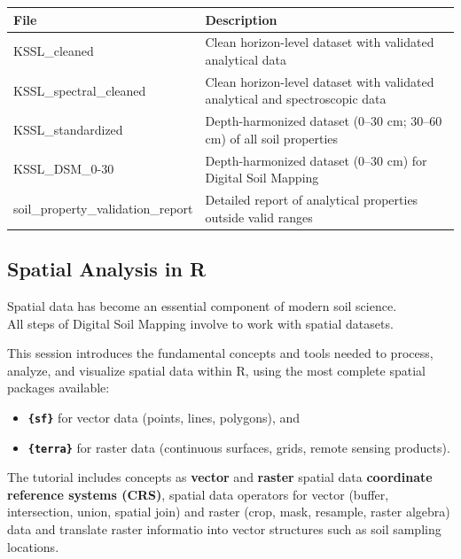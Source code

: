 \documentclass[
  10pt,
  b5paper,
  oneside]{book}
\providecommand{\tightlist}{%
  \setlength{\itemsep}{0pt}\setlength{\parskip}{0pt}}
\begin{document}
\begin{longtable}[]{@{}
  >{\raggedright\arraybackslash}p{}
  >{\raggedright\arraybackslash}p{}@{}}
\toprule\noalign{}
\begin{minipage}[b]{\linewidth}\raggedright
File
\end{minipage} & \begin{minipage}[b]{\linewidth}\raggedright
Description
\end{minipage} \\
\midrule\noalign{}
\endhead
\bottomrule\noalign{}
\endlastfoot
KSSL\_cleaned & Clean horizon-level dataset with validated analytical data \\
KSSL\_spectral\_cleaned & Clean horizon-level dataset with validated analytical and spectroscopic data \\
KSSL\_standardized & Depth-harmonized dataset (0--30 cm; 30--60 cm) of all soil properties \\
KSSL\_DSM\_0-30 & Depth-harmonized dataset (0--30 cm) for Digital Soil Mapping \\
soil\_property\_validation\_report & Detailed report of analytical properties outside valid ranges \\
\end{longtable}

\subsection{Spatial Analysis in R}\label{spatial-analysis-in-r}

Spatial data has become an essential component of modern soil science.\\
All steps of Digital Soil Mapping involve to work with spatial datasets.

This session introduces the fundamental concepts and tools needed to process, analyze, and visualize spatial data within R, using the most complete spatial packages available:

\begin{itemize}
\tightlist
\item
  \textbf{\texttt{\{sf\}}} for vector data (points, lines, polygons), and\\
\item
  \textbf{\texttt{\{terra\}}} for raster data (continuous surfaces, grids, remote sensing products).
\end{itemize}

The tutorial includes concepts as \textbf{vector} and \textbf{raster} spatial data \textbf{coordinate reference systems (CRS)}, spatial data operators for vector (buffer, intersection, union, spatial join) and raster (crop, mask, resample, raster algebra) data and translate raster informatio into vector structures such as soil sampling locations.
\end{document}
